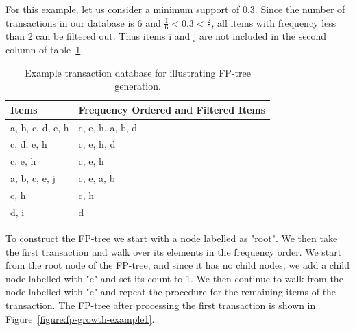 For this example, let us consider a minimum support of 0.3. Since the number of transactions in our database is 6 and $ \frac{1}{6} < 0.3 < \frac{2}{6} $, all items with frequency less than 2 can be filtered out. Thus items i and j are not included in the second column of table~\ref{table:fp-growth-example1}. 

\begin{table}[!htbp]
\begin{center}
    \begin{tabular}{ | l | l | }
    \hline
	\textbf{Items} & \textbf{Frequency Ordered and Filtered Items} \\ \hline
    a, b, c, d, e, h & c, e, h, a, b, d \\ \hline 
    c, d, e, h & c, e, h, d \\ \hline 
    c, e, h & c, e, h \\ \hline 
    a, b, c, e, j & c, e, a, b \\ \hline 
    c, h & c, h \\ \hline
    d, i & d \\ \hline
    \end{tabular}
    \caption{Example transaction database for illustrating FP-tree generation.}
    \label{table:fp-growth-example1}
\end{center}
\end{table} 

To construct the FP-tree we start with a node labelled as "root". We then take the first transaction and walk over its elements in the frequency order. We start from the root node of the FP-tree, and since it has no child nodes, we add a child node labelled with "c" and set its count to 1. We then continue to walk from the node labelled with "c" and repeat the procedure for the remaining items of the transaction. The FP-tree after processing the first transaction is shown in Figure~\ref{figure:fp-growth-example1}.

